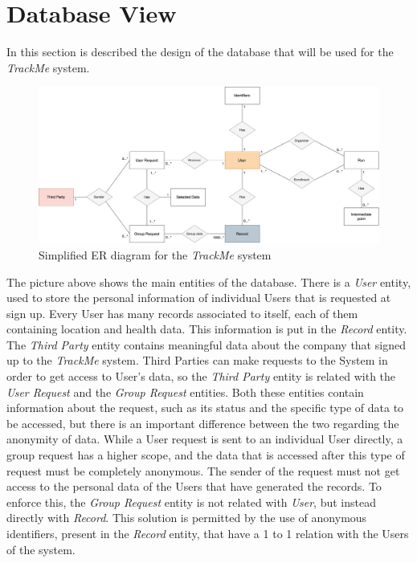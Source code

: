 \section{Database View}

In this section is described the design of the database that will be used for the \textit{TrackMe} system. 

\begin{figure}[H]

\includegraphics[scale=0.13,keepaspectratio]{./Pictures/ER-diagram.png}
\centering
\caption{Simplified ER diagram for the \textit{TrackMe} system}

\end{figure}

The picture above shows the main entities of the database. There is a \textit{User} entity, used to store the personal information of individual Users that is requested at sign up. Every User has many records associated to itself, each of them containing location and health data. This information is put in the \textit{Record} entity. The \textit{Third Party} entity contains meaningful data about the company that signed up to the \textit{TrackMe} system. Third Parties can make requests to the System in order to get access to User's data, so the \textit{Third Party} entity is related with the \textit{User Request} and the \textit{Group Request} entities. Both these entities contain information about the request, such as its status and the specific type of data to be accessed, but there is an important difference between the two regarding the anonymity of data. While a User request is sent to an individual User directly, a group request has a higher scope, and the data that is accessed after this type of request must be completely anonymous. The sender of the request must not get access to the personal data of the Users that have generated the records. To enforce this, the \textit{Group Request} entity is not related with \textit{User}, but instead directly with \textit{Record}. This solution is permitted by the use of anonymous identifiers, present in the \textit{Record} entity, that have a 1 to 1 relation with the Users of the system.


